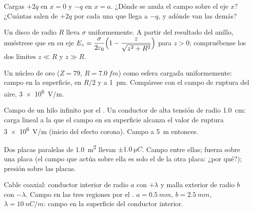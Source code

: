 \begin{exercise}[$\star$]\label{exo:b1:electrostatics-gauss:4}
Cargas $+2q$ en $x = 0$ y $-q$ en $x = a$. ¿Dónde se anula el campo sobre
el eje $x$? ¿Cuántas  salen de $+2q$ por cada una que llega
a $-q$, y adónde van las demás?
\end{exercise}

\begin{exercise}[$\star\star$]\label{exo:b1:electrostatics-gauss:5}
Un disco de radio $R$ lleva $\sigma$ uniformemente. A partir del resultado
del anillo, muéstrese que en su eje $E_z = \dfrac{\sigma}{2\varepsilon_0}\Bigl(1 - \dfrac{z}{\sqrt{z^2 +
R^2}}\Bigr)$ para $z > 0$; compruébense los dos límites $z \ll R$ y $z \gg R$.
\end{exercise}

\begin{exercise}[$\star\star$]\label{exo:b1:electrostatics-gauss:6}
Un núcleo de oro ($Z = 79$, $R = \qty{7.0}{fm}$) como esfera cargada
uniformemente: campo en la superficie, en $R/2$ y a \qty{1}{pm}.
Compárese con el campo de ruptura del aire, \qty{3e6}{V/m}.
\end{exercise}

\begin{exercise}[$\star\star$]\label{exo:b1:electrostatics-gauss:7}
Campo de un hilo infinito por el . Un conductor de alta
tensión de radio \qty{1.0}{cm}: carga lineal a la que el campo en su
superficie alcanza el valor de ruptura \qty{3e6}{V/m} (inicio del efecto
corona). Campo a \qty{5}{m} entonces.
\end{exercise}

\begin{exercise}[$\star\star$]\label{exo:b1:electrostatics-gauss:8}
Dos placas paralelas de \qty{1.0}{m^2} llevan $\pm\qty{1.0}{\micro C}$.
Campo entre ellas; fuerza sobre una placa (el campo que actúa sobre ella
es solo el de la otra placa: ¿por qué?); presión sobre las placas.
\end{exercise}

\begin{exercise}[$\star\star$]\label{exo:b1:electrostatics-gauss:9}
Cable coaxial: conductor interior de radio $a$ con $+\lambda$ y malla
exterior de radio $b$ con $-\lambda$. Campo en las tres regiones por el
. $a = \qty{0.5}{mm}$, $b = \qty{2.5}{mm}$, $\lambda = \qty{10}{nC/m}$:
campo en la superficie del conductor interior.
\end{exercise}

